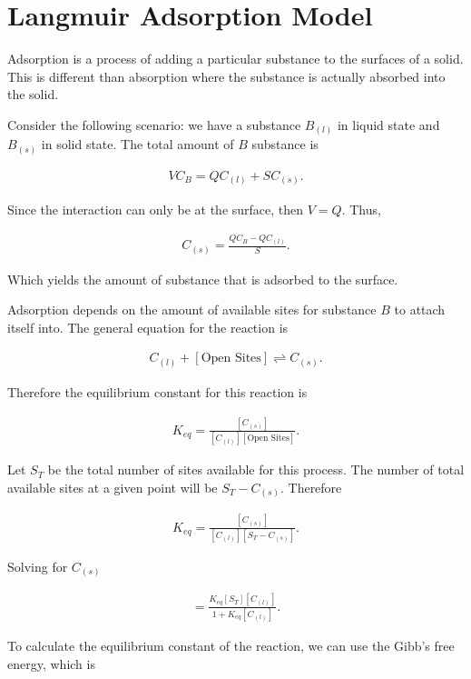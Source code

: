 \section{Langmuir Adsorption Model}

Adsorption is a process of adding a particular substance to the surfaces of a solid. This is different than absorption where the substance is actually absorbed into the solid.

Consider the following scenario: we have a substance $B_{(l)}$ in liquid state and $B_{(s)}$ in solid state. The total amount of $B$ substance is

\begin{align}
	VC_B = QC_{(l)} + S C_{(s)}.
\end{align}

Since the interaction can only be at the surface, then $V = Q$. Thus,

\begin{align}
	C_{(s)} = \frac{QC_B - QC_{(l)}}{S}.
\end{align}

Which yields the amount of substance that is adsorbed to the surface. 

Adsorption depends on the amount of available sites for substance $B$ to attach itself into. The general equation for the reaction is

\begin{align}
	C_{(l)} + \left[\text{Open Sites}\right] \rightleftharpoons C_{(s)}.
\end{align} 

Therefore the equilibrium constant for this reaction is

\begin{align}
	K_{eq} = \frac{[C_{(s)}]}{[C_{(l)}][\text{Open Sites}]}.
\end{align}

Let $S_T$ be the total number of sites available for this process. The number of total available sites at a given point will be $S_T -C_{(s)}$. Therefore

\begin{align}
	K_{eq} = \frac{[C_{(s)}]}{[C_{(l)}][S_T -C_{(s)}]}.
\end{align}

Solving for $C_{(s)}$

\begin{align}
	[C_{(s)}] = \frac{K_{eq}[S_T][C_{(l)}]}{1+K_{eq}[C_{(l)}]}.
\end{align} 

To calculate the equilibrium constant of the reaction, we can use the Gibb's free energy, which is

